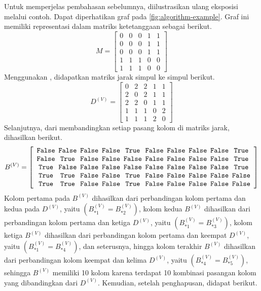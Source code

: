Untuk memperjelas pembahasan sebelumnya, diilustrasikan ulang eksposisi melalui contoh. Dapat diperhatikan graf pada \autoref{fig:algorithm-example}. Graf ini memiliki representasi dalam matriks ketetanggaan sebagai berikut.
\[
	M = \left[ \begin{array}{ccccc}
		0 & 0 & 0 & 1 & 1 \\
		0 & 0 & 0 & 1 & 1 \\
		0 & 0 & 0 & 1 & 1 \\
		1 & 1 & 1 & 0 & 0 \\
		1 & 1 & 1 & 0 & 0
	\end{array} \right]
\]
Menggunakan , didapatkan matriks jarak simpul ke simpul berikut.
\[
	D^{(V)} = \left[ \begin{array}{ccccc}
		0 & 2 & 2 & 1 & 1 \\
		2 & 0 & 2 & 1 & 1 \\
		2 & 2 & 0 & 1 & 1 \\
		1 & 1 & 1 & 0 & 2 \\
		1 & 1 & 1 & 2 & 0
	\end{array} \right]
\]
Selanjutnya, dari membandingkan setiap pasang kolom di matriks jarak, dihasilkan  berikut.
\[
	B^{(V)} = \left[ \begin{array}{c@{\enspace}c@{\enspace}c@{\enspace}c@{\enspace}c@{\enspace}c@{\enspace}c@{\enspace}c@{\enspace}c@{\enspace}c@{\enspace}}
		\False & \False & \False & \False &  \True & \False & \False & \False & \False &  \True \\
		\False &  \True & \False & \False & \False & \False & \False & \False & \False &  \True \\
		 \True & \False & \False & \False & \False & \False & \False & \False & \False &  \True \\
		 \True &  \True & \False & \False &  \True & \False & \False & \False & \False & \False \\
		 \True &  \True & \False & \False &  \True & \False & \False & \False & \False & \False
	\end{array} \right]
\]
Kolom pertama pada \(B^{(V)}\) dihasilkan dari perbandingan kolom pertama dan kedua pada \(D^{(V)}\), yaitu \((B^{(V)}_{*1}=B^{(V)}_{*2})\), kolom kedua \(B^{(V)}\) dihasilkan dari perbandingan kolom pertama dan ketiga \(D^{(V)}\), yaitu \((B^{(V)}_{*1}=B^{(V)}_{*3})\), kolom ketiga \(B^{(V)}\) dihasilkan dari perbandingan kolom pertama dan keempat \(D^{(V)}\), yaitu \((B^{(V)}_{*1}=B^{(V)}_{*4})\), dan seterusnya, hingga kolom terakhir \(B^{(V)}\) dihasilkan dari perbandingan kolom keempat dan kelima \(D^{(V)}\), yaitu \((B^{(V)}_{*4}=B^{(V)}_{*5})\), sehingga \(B^{(V)}\) memiliki 10 kolom karena terdapat 10 kombinasi pasangan kolom yang dibandingkan dari \(D^{(V)}\). Kemudian, setelah penghapusan, didapat  berikut.
